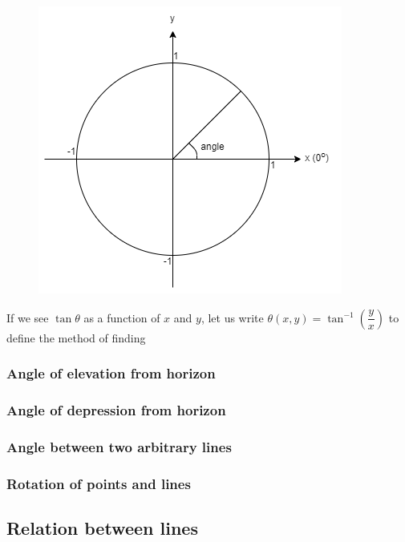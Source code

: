 \documentclass[12pt]{article}
\begin{document}
    \begin{figure}[H]
        \centering
        \includegraphics[scale=0.8]{rectpolar.png}
    \end{figure}

    If we see $\tan{\theta}$ as a function of $x$ and $y$, let us write $\theta(x,y)=\tan^{-1}(\dfrac{y}{x})$ to define the method of finding 

    \subsubsection*{Angle of elevation from horizon}



    \subsubsection*{Angle of depression from horizon}

    \subsubsection*{Angle between two arbitrary lines}

    \subsubsection*{Rotation of points and lines}

    \subsection{Relation between lines}
\end{document}
